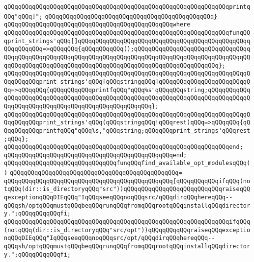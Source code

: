 \verb|qQQqqQQqqQQqqQQqqQQqqQQqqQQqqQQqqQQqqQQqqQQqqQQqqQQqqQQqqQQqqQQqprintqQQq"qQQq]";|\newline
\verb|qQQqqQQqqQQqqQQqqQQqqQQqqQQqqQQqqQQqqQQqqQQqqQQq}|\newline
\verb|qQQqqQQqqQQqqQQqqQQqqQQqqQQqqQQqqQQqqQQqqQQqqQQqwhere|\newline
\verb|qQQqqQQqqQQqqQQqqQQqqQQqqQQqqQQqqQQqqQQqqQQqqQQqqQQqqQQqqQQqqQQqfunqQQqprint_strings'qQQq[]qQQqqQQqqQQqqQQqqQQqqQQqqQQqqQQqqQQqqQQqqQQqqQQqqQQqqQQqqQQq=>qQQqqQQq{qQQqqQQqqQQq();qQQqqQQqqQQqqQQqqQQqqQQqqQQqqQQqqQQqqQQqqQQqqQQqqQQqqQQqqQQqqQQqqQQqqQQqqQQqqQQqqQQqqQQqqQQqqQQqqQQqqQQqqQQqqQQqqQQqqQQqqQQqqQQqqQQqqQQqqQQqqQQqqQQqqQQqqQQqqQQqqQQq};|\newline
\verb|qQQqqQQqqQQqqQQqqQQqqQQqqQQqqQQqqQQqqQQqqQQqqQQqqQQqqQQqqQQqqQQqqQQqqQQqqQQqqQQqprint_strings'qQQq[qQQqstringqQQq]qQQqqQQqqQQqqQQqqQQqqQQqqQQq=>qQQqqQQq{qQQqqQQqqQQqprintfqQQq"qQQq%s"qQQqqQQqstring;qQQqqQQqqQQqqQQqqQQqqQQqqQQqqQQqqQQqqQQqqQQqqQQqqQQqqQQqqQQqqQQqqQQqqQQqqQQqqQQqqQQqqQQqqQQqqQQqqQQqqQQqqQQqqQQqqQQqqQQqqQQq};|\newline
\verb|qQQqqQQqqQQqqQQqqQQqqQQqqQQqqQQqqQQqqQQqqQQqqQQqqQQqqQQqqQQqqQQqqQQqqQQqqQQqqQQqprint_strings'qQQq(qQQqstringqQQq!qQQqrest)qQQq=>qQQqqQQq{qQQqqQQqqQQqprintfqQQq"qQQq%s,"qQQqstring;qQQqqQQqprint_strings'qQQqrest;qQQq};|\newline
\verb|qQQqqQQqqQQqqQQqqQQqqQQqqQQqqQQqqQQqqQQqqQQqqQQqqQQqqQQqqQQqqQQqend;|\newline
\verb|qQQqqQQqqQQqqQQqqQQqqQQqqQQqqQQqqQQqqQQqqQQqqQQqend;|\newline
\newline
\verb|qQQqqQQqqQQqqQQqqQQqqQQqqQQqqQQqfunqQQqfind_available_opt_modulesqQQq()|\newline
\verb|qQQqqQQqqQQqqQQqqQQqqQQqqQQqqQQqqQQqqQQqqQQqqQQq=|\newline
\verb|qQQqqQQqqQQqqQQqqQQqqQQqqQQqqQQqqQQqqQQqqQQqqQQq{qQQqqQQqqQQqifqQQq(notqQQq(dir::is_directoryqQQq"src"))qQQqqQQqqQQqqQQqqQQqqQQqqQQqraiseqQQqexceptionqQQqDIEqQQq"IqQQqseeqQQqnoqQQqsrc/qQQqdirqQQqhereqQQq--qQQqsh/optqQQqmustqQQqbeqQQqrunqQQqfromqQQqrootqQQqinstallqQQqdirectory.";qQQqqQQqqQQqfi;|\newline
\verb|qQQqqQQqqQQqqQQqqQQqqQQqqQQqqQQqqQQqqQQqqQQqqQQqqQQqqQQqqQQqqQQqifqQQq(notqQQq(dir::is_directoryqQQq"src/opt"))qQQqqQQqqQQqraiseqQQqexceptionqQQqDIEqQQq"IqQQqseeqQQqnoqQQqsrc/opt/qQQqdirqQQqhereqQQq--qQQqsh/optqQQqmustqQQqbeqQQqrunqQQqfromqQQqrootqQQqinstallqQQqdirectory.";qQQqqQQqqQQqfi;|\newline
